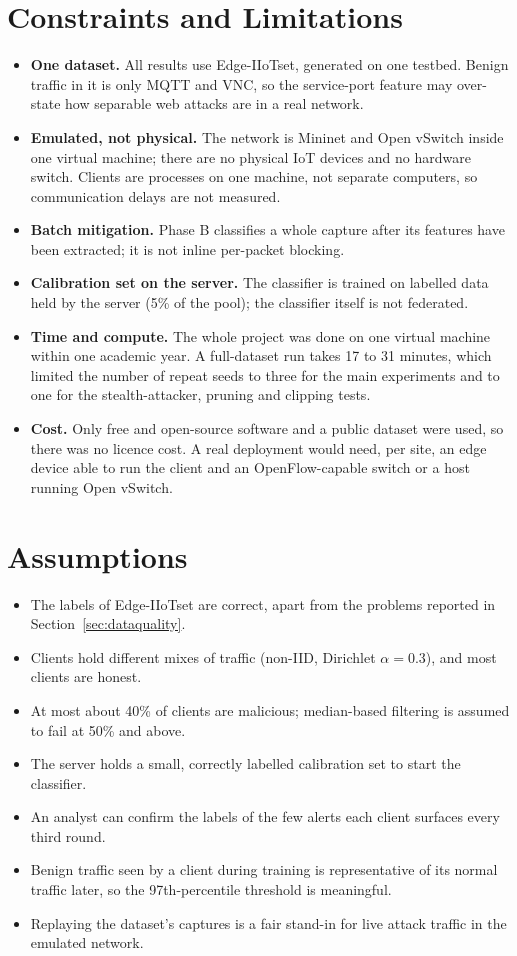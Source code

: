 \section{Constraints and Limitations}
\begin{itemize}
  \item \textbf{One dataset.} All results use Edge-IIoTset, generated on one testbed. Benign traffic in it is only MQTT and VNC, so the service-port feature may over-state how separable web attacks are in a real network.
  \item \textbf{Emulated, not physical.} The network is Mininet and Open vSwitch inside one virtual machine; there are no physical IoT devices and no hardware switch. Clients are processes on one machine, not separate computers, so communication delays are not measured.
  \item \textbf{Batch mitigation.} Phase B classifies a whole capture after its features have been extracted; it is not inline per-packet blocking.
  \item \textbf{Calibration set on the server.} The classifier is trained on labelled data held by the server (5\% of the pool); the classifier itself is not federated.
  \item \textbf{Time and compute.} The whole project was done on one virtual machine within one academic year. A full-dataset run takes 17 to 31 minutes, which limited the number of repeat seeds to three for the main experiments and to one for the stealth-attacker, pruning and clipping tests.
  \item \textbf{Cost.} Only free and open-source software and a public dataset were used, so there was no licence cost. A real deployment would need, per site, an edge device able to run the client and an OpenFlow-capable switch or a host running Open vSwitch.
\end{itemize}

\section{Assumptions}
\begin{itemize}
  \item The labels of Edge-IIoTset are correct, apart from the problems reported in Section~\ref{sec:dataquality}.
  \item Clients hold different mixes of traffic (non-IID, Dirichlet $\alpha=0.3$), and most clients are honest.
  \item At most about 40\% of clients are malicious; median-based filtering is assumed to fail at 50\% and above.
  \item The server holds a small, correctly labelled calibration set to start the classifier.
  \item An analyst can confirm the labels of the few alerts each client surfaces every third round.
  \item Benign traffic seen by a client during training is representative of its normal traffic later, so the 97th-percentile threshold is meaningful.
  \item Replaying the dataset's captures is a fair stand-in for live attack traffic in the emulated network.
\end{itemize}

